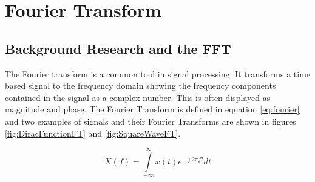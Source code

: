 

\section{Fourier Transform}
\subsection{Background Research and the FFT}
The Fourier transform is a common tool in signal processing. It transforms a time based signal to the frequency domain showing the frequency components contained in the signal as a complex number. This is often displayed as magnitude and phase. The Fourier Transform is defined in equation \eqref{eq:fourier} and two examples of signals and their Fourier Transforms are shown in figures \ref{fig:DiracFunctionFT} and \ref{fig:SquareWaveFT}. 
 
\begin{equation}\label{eq:fourier}
X(f) = \int\limits_{-\infty}^{\infty}x(t)e^{-\jmath 2 \pi ft}dt
\end{equation}

